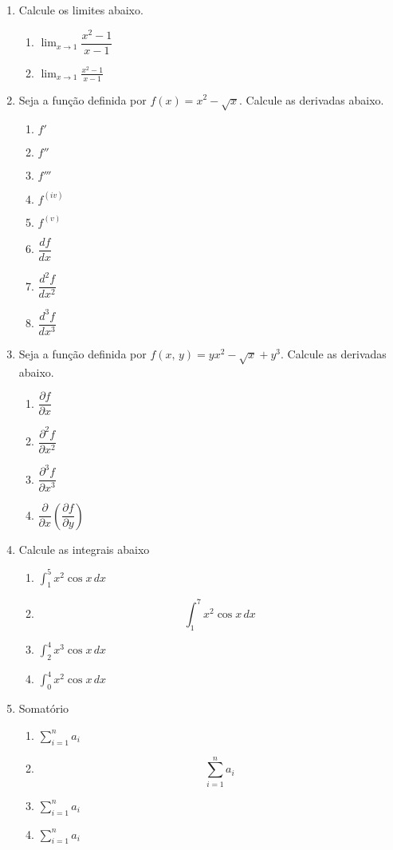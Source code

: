 \documentclass[a4paper,12pt]{article}
\newcommand{\limite}{\displaystyle\lim}
\newcommand{\integral}{\displaystyle\int}
\newcommand{\somatorio}{\displaystyle\sum}
\begin{document}
\begin{enumerate}
\begin{comment}
Tags para cálculo
\end{comment}
\item Calcule os limites abaixo.
\begin{enumerate}
\item $\limite_{x \to 1} \dfrac{x^2 - 1}{x-1}$
\item $\displaystyle\lim_{x \to 1} \frac{x^2 - 1}{x-1}$
\end{enumerate}
\item Seja a função definida por $f(x)=x^2- \sqrt{x}$. Calcule as derivadas abaixo.
\begin{enumerate}
\item $f'$
\item $f''$
\item $f'''$
\item $f^{(iv)}$
\item $f^{(v)}$
\item $\dfrac{df}{dx}$
\item $\dfrac{d^2f}{dx^2}$
\item $\dfrac{d^3f}{dx^3}$
\end{enumerate}
\item Seja a função definida por $f(x,\,y)=yx^2- \sqrt{x} + y^3$. Calcule as derivadas abaixo.
\begin{enumerate}
\item $\dfrac{\partial f}{\partial x}$
\item $\dfrac{\partial^2f}{\partial x^2}$
\item $\dfrac{\partial^3f}{\partial x^3}$
\item $\dfrac{\partial }{\partial x}\left(\dfrac{\partial f}{\partial y}\right)$
\end{enumerate}

\item Calcule as integrais abaixo
\begin{enumerate}
\item $\int_1^5 x^2\cos x\,dx$
\item $$\int_1^7 x^2\cos x\,dx$$
\item $\displaystyle\int_2^4 x^3\cos x\,dx$
\item $\integral_0^4 x^2\cos x\,dx$
\end{enumerate}

\item Somatório
\begin{enumerate}
\item $\sum_{i=1}^n a_i$
\item $$\sum_{i=1}^n a_i$$
\item $\displaystyle\sum_{i=1}^n a_i$
\item $\somatorio_{i=1}^n a_i$
\end{enumerate}
\end{enumerate}
\end{document}
